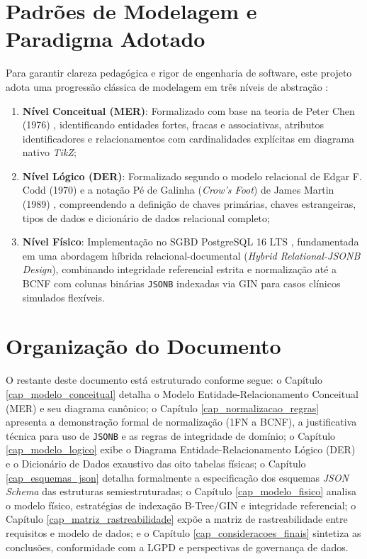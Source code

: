 \section{Padrões de Modelagem e Paradigma Adotado}
\label{sec_padroes_adotados}

Para garantir clareza pedagógica e rigor de engenharia de software, este projeto adota uma progressão clássica de modelagem em três níveis de abstração \cite{elmasri2016, heuser2009}:

\begin{enumerate}
    \item \textbf{Nível Conceitual (MER)}: Formalizado com base na teoria de Peter Chen (1976) \cite{chen1976}, identificando entidades fortes, fracas e associativas, atributos identificadores e relacionamentos com cardinalidades explícitas em diagrama nativo \textit{TikZ};
    \item \textbf{Nível Lógico (DER)}: Formalizado segundo o modelo relacional de Edgar F. Codd (1970) \cite{codd1970} e a notação Pé de Galinha (\textit{Crow's Foot}) de James Martin (1989) \cite{martin1989}, compreendendo a definição de chaves primárias, chaves estrangeiras, tipos de dados e dicionário de dados relacional completo;
    \item \textbf{Nível Físico}: Implementação no SGBD PostgreSQL 16 LTS \cite{postgresql2024}, fundamentada em uma abordagem híbrida relacional-documental (\textit{Hybrid Relational-JSONB Design}), combinando integridade referencial estrita e normalização até a BCNF com colunas binárias \texttt{JSONB} indexadas via GIN para casos clínicos simulados flexíveis.
\end{enumerate}

\section{Organização do Documento}
\label{sec_organizacao_doc}

O restante deste documento está estruturado conforme segue:
o Capítulo \ref{cap_modelo_conceitual} detalha o Modelo Entidade-Relacionamento Conceitual (MER) e seu diagrama canônico;
o Capítulo \ref{cap_normalizacao_regras} apresenta a demonstração formal de normalização (1FN a BCNF), a justificativa técnica para uso de \texttt{JSONB} e as regras de integridade de domínio;
o Capítulo \ref{cap_modelo_logico} exibe o Diagrama Entidade-Relacionamento Lógico (DER) e o Dicionário de Dados exaustivo das oito tabelas físicas;
o Capítulo \ref{cap_esquemas_json} detalha formalmente a especificação dos esquemas \textit{JSON Schema} das estruturas semiestruturadas;
o Capítulo \ref{cap_modelo_fisico} analisa o modelo físico, estratégias de indexação B-Tree/GIN e integridade referencial;
o Capítulo \ref{cap_matriz_rastreabilidade} expõe a matriz de rastreabilidade entre requisitos e modelo de dados;
e o Capítulo \ref{cap_consideracoes_finais} sintetiza as conclusões, conformidade com a LGPD e perspectivas de governança de dados.
